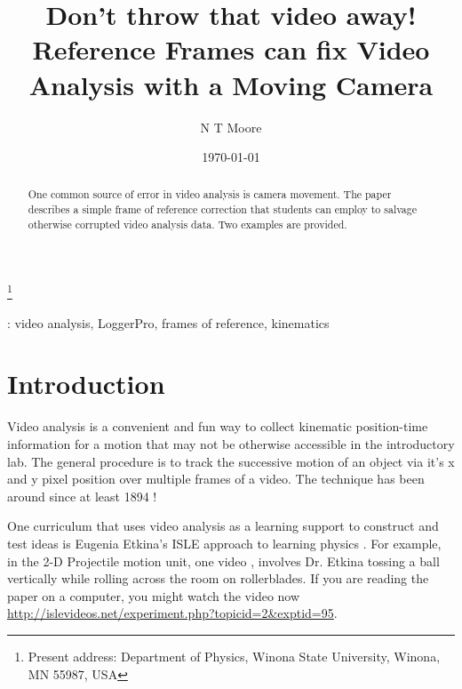 \documentclass[12pt]{iopart}
\begin{document}
\title[Don't throw that video away! Reference Frames can fix Video Analysis with a Moving Camera]{Don't throw that video away! Reference Frames can fix Video Analysis with a Moving Camera}
\author{N T Moore}
\footnote{Present address:
Department of Physics, Winona State University, Winona, MN 55987, USA}

\date{\today}

\begin{abstract}
One common source of error in video analysis is camera movement.  The paper describes a simple frame of reference correction that students can employ to salvage otherwise corrupted video analysis data.  Two examples are provided. 
\end{abstract}

: video analysis, LoggerPro, frames of reference, kinematics

\submitto{\PED}

\maketitle

\section{Introduction} 
Video analysis is a convenient and fun way to collect kinematic position-time information for a motion that may not be otherwise accessible in the introductory lab.  The general procedure is to track the successive motion of an object via it's x and y pixel position over multiple frames of a video.  The technique has been around since at least 1894 \cite{nature_cat}!
  

One curriculum that uses video analysis as a learning support to construct and test ideas is Eugenia Etkina's ISLE approach to learning physics \cite{ISLE_overview}. 
For example, in the 2-D Projectile motion unit, one video \cite{ISLE_ball_video_source}, involves Dr. Etkina tossing a ball vertically while rolling across the room on rollerblades. If you are reading the paper on a computer, you might watch the video now \url{http://islevideos.net/experiment.php?topicid=2&exptid=95}.   
\end{document}
